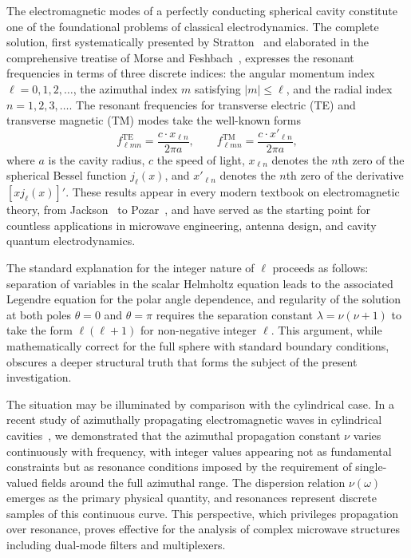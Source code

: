 \documentclass[
  aip,
  amsmath,amssymb,
  preprint
]{revtex4-1}
\begin{document}
The electromagnetic modes of a perfectly conducting spherical cavity constitute one of the foundational problems of classical electrodynamics. The complete solution, first systematically presented by Stratton~\cite{Stratton1941} and elaborated in the comprehensive treatise of Morse and Feshbach~\cite{MorseFeshbach1953}, expresses the resonant frequencies in terms of three discrete indices: the angular momentum index $\ell = 0, 1, 2, \ldots$, the azimuthal index $m$ satisfying $|m| \leq \ell$, and the radial index $n = 1, 2, 3,\ldots$. The resonant frequencies for transverse electric (TE) and transverse magnetic (TM) modes take the well-known forms
\begin{equation}
f_{\ell m n}^{\text{TE}} = \frac{c \cdot x_{\ell n}}{2\pi a}, \qquad
f_{\ell m n}^{\text{TM}} = \frac{c \cdot x'_{\ell n}}{2\pi a},
\label{eq:standard_resonances}
\end{equation}
where $a$ is the cavity radius, $c$ the speed of light, $x_{\ell n}$ denotes the $n$th zero of the spherical Bessel function $j_\ell(x)$, and $x'_{\ell n}$ denotes the $n$th zero of the derivative $[xj_\ell(x)]'$. These results appear in every modern textbook on electromagnetic theory, from Jackson~\cite{Jackson1999} to Pozar~\cite{Pozar2012}, and have served as the starting point for countless applications in microwave engineering, antenna design, and cavity quantum electrodynamics.

The standard explanation for the integer nature of $\ell$ proceeds as follows: separation of variables in the scalar Helmholtz equation leads to the associated Legendre equation for the polar angle dependence, and regularity of the solution at both poles $\theta = 0$ and $\theta = \pi$ requires the separation constant $\lambda = \nu(\nu+1)$ to take the form $\ell(\ell+1)$ for non-negative integer $\ell$. This argument, while mathematically correct for the full sphere with standard boundary conditions, obscures a deeper structural truth that forms the subject of the present investigation.

The situation may be illuminated by comparison with the cylindrical case. In a recent study of azimuthally propagating electromagnetic waves in cylindrical cavities~\cite{BakrAmari2023, BakrAmari2025}, we demonstrated that the azimuthal propagation constant $\nu$ varies continuously with frequency, with integer values appearing not as fundamental constraints but as resonance conditions imposed by the requirement of single-valued fields around the full azimuthal range. The dispersion relation $\nu(\omega)$ emerges as the primary physical quantity, and resonances represent discrete samples of this continuous curve. This perspective, which privileges propagation over resonance, proves effective for the analysis of complex microwave structures including dual-mode filters and multiplexers.
\end{document}
